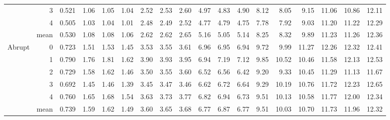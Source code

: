 {\begin{tabular}{lrr*{5}{rrr}}
 & 3 & 0.521 & 1.06 & 1.05 & 1.04 & 2.52 & 2.53 & 2.60 & 4.97 & 4.83 & 4.90 & 8.12 & 8.05 & 9.15 & 11.06 & 10.86 & 12.11 \\
 & 4 & 0.505 & 1.03 & 1.04 & 1.01 & 2.48 & 2.49 & 2.52 & 4.77 & 4.79 & 4.75 & 7.78 & 7.92 & 9.03 & 11.20 & 11.22 & 12.29 \\
 & mean & 0.530 & 1.08 & 1.08 & 1.06 & 2.62 & 2.62 & 2.65 & 5.16 & 5.05 & 5.14 & 8.25 & 8.32 & 9.89 & 11.23 & 11.26 & 12.36 \\
\addlinespace
Abrupt & 0 & 0.723 & 1.51 & 1.53 & 1.45 & 3.53 & 3.55 & 3.61 & 6.96 & 6.95 & 6.94 & 9.72 & 9.99 & 11.27 & 12.26 & 12.32 & 12.41 \\
 & 1 & 0.790 & 1.76 & 1.81 & 1.62 & 3.90 & 3.93 & 3.95 & 6.94 & 7.19 & 7.12 & 9.85 & 10.52 & 10.46 & 11.58 & 12.13 & 12.53 \\
 & 2 & 0.729 & 1.58 & 1.62 & 1.46 & 3.50 & 3.55 & 3.60 & 6.52 & 6.56 & 6.42 & 9.20 & 9.33 & 10.45 & 11.29 & 11.13 & 11.67 \\
 & 3 & 0.692 & 1.45 & 1.46 & 1.39 & 3.45 & 3.47 & 3.46 & 6.62 & 6.72 & 6.64 & 9.29 & 10.19 & 10.76 & 11.72 & 12.23 & 12.65 \\
 & 4 & 0.760 & 1.65 & 1.68 & 1.54 & 3.63 & 3.73 & 3.77 & 6.82 & 6.94 & 6.73 & 9.51 & 10.13 & 10.58 & 11.77 & 12.00 & 12.34 \\
 & mean & 0.739 & 1.59 & 1.62 & 1.49 & 3.60 & 3.65 & 3.68 & 6.77 & 6.87 & 6.77 & 9.51 & 10.03 & 10.70 & 11.73 & 11.96 & 12.32 \\
\bottomrule
\end{tabular}}


